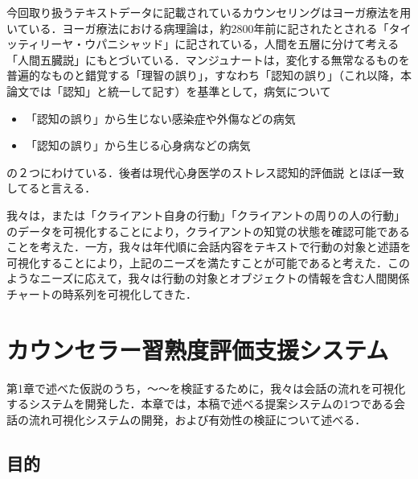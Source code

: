 \documentclass[shuuron]{kuee}
\begin{document}
今回取り扱うテキストデータに記載されているカウンセリングはヨーガ療法を用いている．ヨーガ療法における病理論は，約2800年前に記されたとされる「タイッティリーヤ・ウパニシャッド」に記されている，人間を五層に分けて考える「人間五臓説」にもとづいている\cite{kimura}．マンジュナート\cite{manjunath}は，変化する無常なるものを普遍的なものと錯覚する「理智の誤り」，すなわち「認知の誤り」（これ以降，本論文では「認知」と統一して記す）を基準として，病気について
\begin{itemize}
\item 「認知の誤り」から生じない感染症や外傷などの病気
\item 「認知の誤り」から生じる心身病などの病気
\end{itemize}
の２つにわけている．後者は現代心身医学のストレス認知的評価説
\cite{Lazarus}とほぼ一致してると言える\cite{Darshana}．



 我々は，または「クライアント自身の行動」「クライアントの周りの人の行動」のデータを可視化することにより，クライアントの知覚の状態を確認可能であることを考えた．一方，我々は年代順に会話内容をテキストで行動の対象と述語を可視化することにより，上記のニーズを満たすことが可能であると考えた．このようなニーズに応えて，我々は行動の対象とオブジェクトの情報を含む人間関係チャートの時系列を可視化してきた．



\chapter{カウンセラー習熟度評価支援システム}





第1章で述べた仮説のうち，〜〜を検証するために，我々は会話の流れを可視化するシステムを開発した．本章では，本稿で述べる提案システムの1つである会話の流れ可視化システムの開発，および有効性の検証について述べる．
\section{目的}
\end{document}
